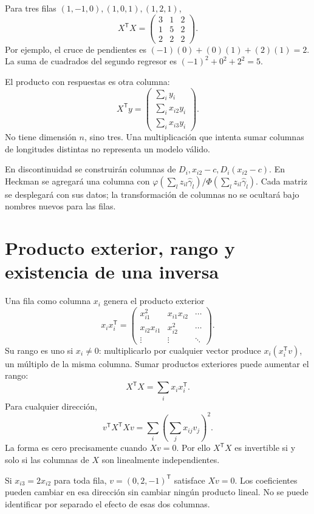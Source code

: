 \documentclass[11pt,a4paper]{article}
\newcommand{\T}{^{\mathsf T}}
\begin{document}
Para tres filas \((1,-1,0),(1,0,1),(1,2,1)\),
\[
X\T X=
\begin{pmatrix}3&1&2\\1&5&2\\2&2&2\end{pmatrix}.
\]
Por ejemplo, el cruce de pendientes es
\((-1)(0)+(0)(1)+(2)(1)=2\).
La suma de cuadrados del segundo regresor es
\((-1)^2+0^2+2^2=5\).

El producto con respuestas es otra columna:
\[
X\T y=
\begin{pmatrix}
\sum_i y_i\\\sum_i x_{i2}y_i\\\sum_i x_{i3}y_i
\end{pmatrix}.
\]
No tiene dimensión \(n\), sino tres.
Una multiplicación que intenta sumar columnas
de longitudes distintas no representa un modelo válido.

En discontinuidad se construirán columnas de
\(D_i,x_{i2}-c,D_i(x_{i2}-c)\).
En Heckman se agregará una columna con
\(\varphi(\sum_lz_{il}\widehat\gamma_l)/
\Phi(\sum_lz_{il}\widehat\gamma_l)\).
Cada matriz se desplegará con sus datos;
la transformación de columnas no se ocultará
bajo nombres nuevos para las filas.

\clearpage
\section{Producto exterior, rango y existencia de una inversa}\label{unidad7}
Una fila como columna \(x_i\) genera el producto exterior
\[
x_ix_i\T=
\begin{pmatrix}
x_{i1}^2&x_{i1}x_{i2}&\cdots\\
x_{i2}x_{i1}&x_{i2}^2&\cdots\\
\vdots&\vdots&\ddots
\end{pmatrix}.
\]
Su rango es uno si \(x_i\ne0\):
multiplicarlo por cualquier vector produce
\(x_i(x_i\T v)\), un múltiplo de la misma columna.
Sumar productos exteriores puede aumentar el rango:
\[
X\T X=\sum_i x_ix_i\T.
\]
Para cualquier dirección,
\[
v\T X\T Xv
=\sum_i\left(\sum_jx_{ij}v_j\right)^2.
\]
La forma es cero precisamente cuando \(Xv=0\).
Por ello \(X\T X\) es invertible si y solo si
las columnas de \(X\) son linealmente independientes.

Si \(x_{i3}=2x_{i2}\) para toda fila,
\(v=(0,2,-1)\T\) satisface \(Xv=0\).
Los coeficientes pueden cambiar en esa dirección
sin cambiar ningún producto lineal.
No se puede identificar por separado
el efecto de esas dos columnas.
\end{document}
